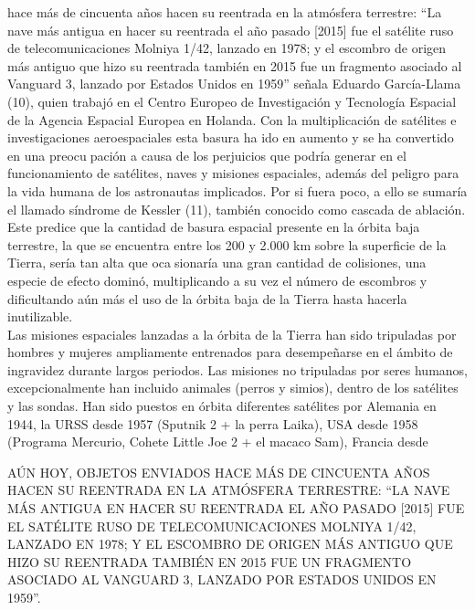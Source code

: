 \documentclass[12pt,letterpaper]{article}
\begin{document}
\begin{multicols}{2}
\noindent hace más de cincuenta años hacen su reentrada en la 
atmósfera terrestre: “La nave más antigua en hacer su reentrada el año pasado [2015] fue el satélite ruso de telecomunicaciones Molniya 1/42, lanzado en 1978; y el escombro de origen más antiguo que hizo su reentrada también en 2015 fue un fragmento asociado al Vanguard 3, lanzado por Estados Unidos en 1959” señala Eduardo García-Llama (10), quien trabajó en el Centro Europeo de Investigación y Tecnología Espacial de la Agencia Espacial Europea en Holanda. Con la multiplicación de satélites e investigaciones aeroespaciales esta basura ha ido en aumento y se ha convertido en una preocupación a causa de los perjuicios que podría generar en el funcionamiento de satélites, naves y misiones espaciales, además del peligro para la vida humana de los astronautas implicados. Por si fuera poco, a ello se sumaría el llamado síndrome de Kessler (11), también conocido como cascada de ablación. Este predice que la cantidad de basura espacial presente en la órbita baja terrestre, la que se encuentra entre los 200 y 2.000 km sobre la superficie de la Tierra, sería tan alta que ocasionaría una gran cantidad de colisiones, una especie de efecto dominó, multiplicando a su vez el número de escombros y dificultando aún más el uso de la órbita baja de la Tierra hasta hacerla inutilizable.
\\

\noindent Las misiones espaciales lanzadas a la órbita de la Tierra han sido tripuladas por hombres y mujeres ampliamente entrenados para desempeñarse en el ámbito de ingravidez durante largos periodos. Las misiones no tripuladas por seres humanos, excepcionalmente han incluido animales (perros y simios), dentro de los satélites y las sondas. Han sido puestos en órbita diferentes satélites 
por Alemania en 1944, la URSS desde 1957 (Sputnik 2 
+ la perra Laika), USA desde 1958 (Programa Mercurio, 
Cohete Little Joe 2 + el macaco Sam), Francia desde
\\

\begin{center}
AÚN HOY, OBJETOS ENVIADOS HACE MÁS
DE CINCUENTA AÑOS HACEN SU REENTRADA
EN LA ATMÓSFERA TERRESTRE: “LA NAVE
MÁS ANTIGUA EN HACER SU REENTRADA
EL AÑO PASADO [2015] FUE EL SATÉLITE
RUSO DE TELECOMUNICACIONES MOLNIYA
1/42, LANZADO EN 1978; Y EL ESCOMBRO
DE ORIGEN MÁS ANTIGUO QUE HIZO SU
REENTRADA TAMBIÉN EN 2015 FUE UN
FRAGMENTO ASOCIADO AL VANGUARD 3, 
LANZADO POR ESTADOS UNIDOS EN 1959”.
\end{center}
\\


\end{multicols}
\end{document}
